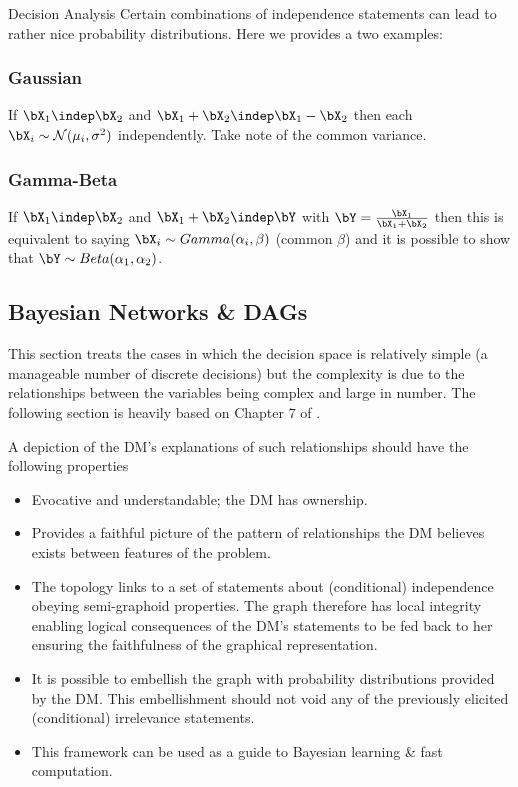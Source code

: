 \begin{chapter}{Decision Analysis \label{Ch:decision}}
Certain combinations of independence statements can lead to rather nice probability distributions. Here we provides a two examples:

\subsubsection*{Gaussian}

If $\bX_1 \indep \bX_2$ and $\bX_1 + \bX_2 \indep \bX_1 - \bX_2  $ then each $\bX_i \sim \mathcal{N}(\mu_i, \sigma^2)$ independently. Take note of the common variance.

\subsubsection*{Gamma-Beta}

If $\bX_1 \indep \bX_2$ and $\bX_1 + \bX_2 \indep \bY$ with $\bY = \frac{\bX_1}{\bX_1 + \bX_2}$ then this is equivalent to saying $\bX_i \sim Gamma(\alpha_i, \beta)$ (common $\beta$) and it is possible to show that $\bY \sim Beta(\alpha_1, \alpha_2)$.


\subsection{Bayesian Networks \& DAGs}

This section treats the cases in which the decision space is relatively simple (a manageable number of discrete decisions) but the complexity is due to the relationships between the variables being complex and large in number. The following section is heavily based on Chapter $7$ of \citet{Smith2010}.

A depiction of the DM's explanations of such relationships should have the following properties

\begin{itemize}

	\item Evocative and understandable; the DM has ownership.
	\item Provides a faithful picture of the pattern of relationships the DM believes exists between features of the problem.
	\item The topology links to a set of statements about (conditional) independence obeying semi-graphoid properties. The graph therefore has local integrity enabling logical consequences of the DM's statements to be fed back to her ensuring the faithfulness of the graphical representation.
	\item It is possible to embellish the graph with probability distributions provided by the DM. This embellishment should not void any of the previously elicited (conditional) irrelevance statements.
	\item This framework can be used as a guide to Bayesian learning \& fast computation.


\end{itemize}
\end{chapter}
